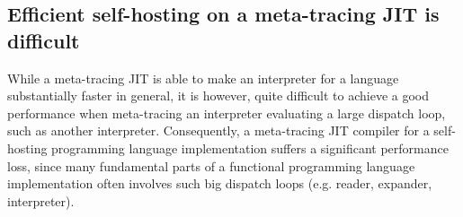 \subsection{Efficient self-hosting on a meta-tracing JIT is difficult}

While a meta-tracing JIT is able to make an interpreter for a language
substantially faster in general, it is however, quite difficult to
achieve a good performance when meta-tracing an interpreter evaluating
a large dispatch loop, such as another interpreter. Consequently, a
meta-tracing JIT compiler for a self-hosting programming language
implementation suffers a significant performance loss, since many
fundamental parts of a functional programming language implementation
often involves such big dispatch loops (e.g. reader, expander,
interpreter).

